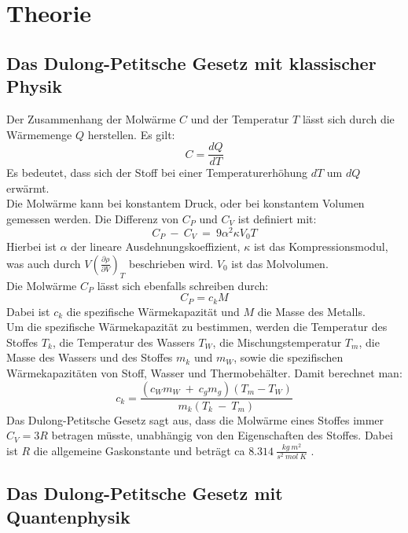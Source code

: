 \section{Theorie}
\label{sec:Theorie}

\subsection{Das Dulong-Petitsche Gesetz mit klassischer Physik}

Der Zusammenhang der Molwärme $C$ und der Temperatur $T$ lässt sich durch die Wärmemenge $Q$ herstellen.
Es gilt:
\begin{equation}
    C = \frac{dQ}{dT}
\end{equation}
Es bedeutet, dass sich der Stoff bei einer Temperaturerhöhung $dT$ um $dQ$ erwärmt.\\
Die Molwärme kann bei konstantem Druck, oder bei konstantem Volumen gemessen werden.
Die Differenz von $C_P$ und $C_V$ ist definiert mit:
\begin{equation}
    C_P\ -\ C_V \ =\ 9\alpha^2 \kappa V_0 T
\end{equation}
Hierbei ist $\alpha$ der lineare Ausdehnungskoeffizient, $\kappa$ ist das Kompressionsmodul, was auch durch $V(\frac{\partial\rho}{\partial V})_T$ beschrieben wird.
$V_0$ ist das Molvolumen.\\
Die Molwärme $C_P$ lässt sich ebenfalls schreiben durch:
\begin{equation}
    C_P = c_kM
    \label{eq:cp}
\end{equation}
Dabei ist $c_k$ die spezifische Wärmekapazität und $M$ die Masse des Metalls.\\
Um die spezifische Wärmekapazität zu bestimmen, werden die Temperatur des Stoffes $T_k$, die Temperatur des Wassers $T_W$, die Mischungstemperatur $T_m$, die Masse des Wassers und des Stoffes $m_k$ und $m_W$, sowie die spezifischen Wärmekapazitäten von Stoff, Wasser und Thermobehälter.
Damit berechnet man:
\begin{equation}
    c_k = \frac{(c_Wm_W\ +\ c_gm_g)(T_m-T_W)}{m_k(T_k\ -\ T_m)}
    \label{eq:warmcap}
\end{equation}
\newline
Das Dulong-Petitsche Gesetz sagt aus, dass die Molwärme eines Stoffes immer $C_V = 3R$ betragen müsste, unabhängig von den Eigenschaften des Stoffes.
Dabei ist $R$ die allgemeine Gaskonstante und beträgt ca $8.314\ \frac{kg\ m^2}{s^2\ mol\ K}$ \cite{gas}.

\subsection{Das Dulong-Petitsche Gesetz mit Quantenphysik}

